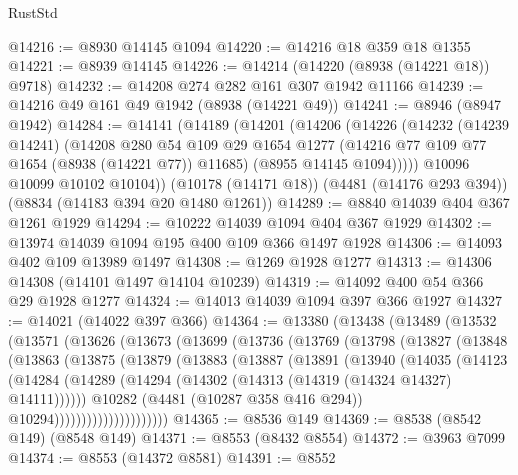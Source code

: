 \begin{lexlean}{RustStd}
\begin{coremodule}
@14216 := @8930 @14145 @1094
@14220 := @14216 @18 @359 @18 @1355
@14221 := @8939 @14145
@14226 := @14214 (@14220 (@8938 (@14221 @18)) @9718)
@14232 := @14208 @274 @282 @161 @307 @1942 @11166
@14239 := @14216 @49 @161 @49 @1942 (@8938 (@14221 @49))
@14241 := @8946 (@8947 @1942)
@14284 := @14141
    (@14189
      (@14201
        (@14206
          (@14226
            (@14232
              (@14239 @14241)
              (@14208
                @280
                @54
                @109
                @29
                @1654
                @1277
                (@14216 @77 @109 @77 @1654 (@8938 (@14221 @77)) @11685)
                (@8955 @14145 @1094)))))
        @10096
        @10099
        @10102
        @10104))
    (@10178 (@14171 @18))
    (@4481 (@14176 @293 @394))
    (@8834 (@14183 @394 @20 @1480 @1261))
@14289 := @8840 @14039 @404 @367 @1261 @1929
@14294 := @10222 @14039 @1094 @404 @367 @1929
@14302 := @13974 @14039 @1094 @195 @400 @109 @366 @1497 @1928
@14306 := @14093 @402 @109 @13989 @1497
@14308 := @1269 @1928 @1277
@14313 := @14306 @14308 (@14101 @1497 @14104 @10239)
@14319 := @14092 @400 @54 @366 @29 @1928 @1277
@14324 := @14013 @14039 @1094 @397 @366 @1927
@14327 := @14021 (@14022 @397 @366)
@14364 := @13380
    (@13438
      (@13489
        (@13532
          (@13571
            (@13626
              (@13673
                (@13699
                  (@13736
                    (@13769
                      (@13798
                        (@13827
                          (@13848
                            (@13863
                              (@13875
                                (@13879
                                  (@13883
                                    (@13887
                                      (@13891
                                        (@13940
                                          (@14035
                                            (@14123
                                              (@14284
                                                (@14289
                                                  (@14294
                                                    (@14302
                                                      (@14313 (@14319 (@14324 @14327) @14111))))))
                                              @10282
                                              (@4481 (@10287 @358 @416 @294))
                                              @10294)))))))))))))))))))))
@14365 := @8536 @149
@14369 := @8538 (@8542 @149) (@8548 @149)
@14371 := @8553 (@8432 @8554)
@14372 := @3963 @7099
@14374 := @8553 (@14372 @8581)
@14391 := @8552

\end{coremodule}
\end{lexlean}
